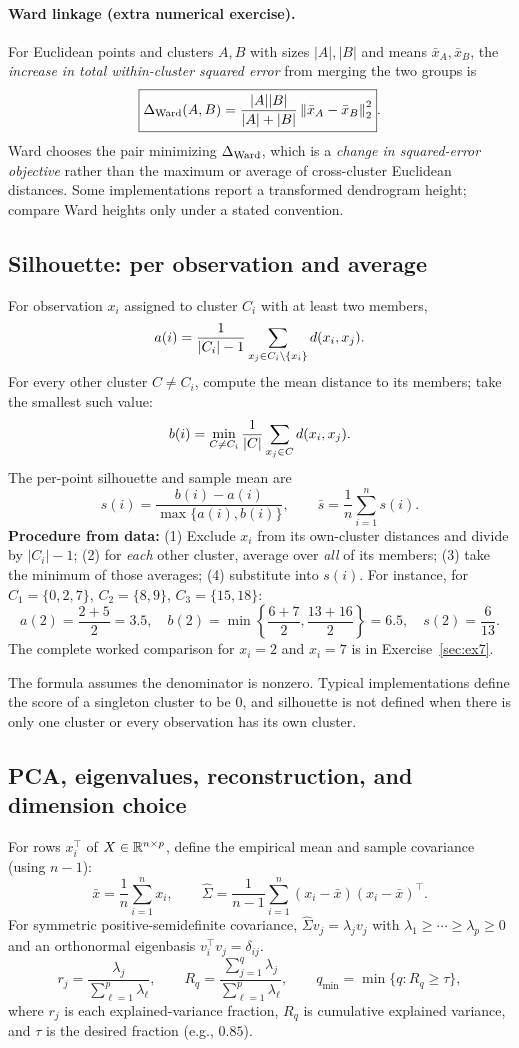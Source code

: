 \paragraph{Ward linkage (extra numerical exercise).}
For Euclidean points and clusters $A,B$ with sizes $|A|,|B|$ and means $\bar x_A,\bar x_B$, the \emph{increase in total within-cluster squared error} from merging the two groups is
\[
\boxed{\Delta_{\rm Ward}(A,B)=\frac{|A||B|}{|A|+|B|}\left\lVert\bar x_A-\bar x_B\right\rVert_2^2}.
\]
Ward chooses the pair minimizing $\Delta_{\rm Ward}$, which is a \emph{change in squared-error objective} rather than the maximum or average of cross-cluster Euclidean distances. Some implementations report a transformed dendrogram height; compare Ward heights only under a stated convention.

\subsection{Silhouette: per observation and average}
For observation $x_i$ assigned to cluster $C_i$ with at least two members,
\[
a(i)=\frac1{\left\lvert C_i\right\rvert-1}\sum_{x_j\in C_i\setminus\{x_i\}}d(x_i,x_j).
\]
For every other cluster $C\ne C_i$, compute the mean distance to its members; take the smallest such value:
\[
b(i)=\min_{C\ne C_i}\frac1{\left\lvert C\right\rvert}\sum_{x_j\in C}d(x_i,x_j).
\]
The per-point silhouette and sample mean are
\[
\boxed{s(i)=\frac{b(i)-a(i)}{\max\{a(i),b(i)\}}},\qquad
\boxed{\bar s=\frac1n\sum_{i=1}^{n}s(i)}.
\]
\textbf{Procedure from data:} (1) Exclude $x_i$ from its own-cluster distances and divide by $|C_i|-1$; (2) for \emph{each} other cluster, average over \emph{all} of its members; (3) take the minimum of those averages; (4) substitute into $s(i)$. For instance, for $C_1=\{0,2,7\}$, $C_2=\{8,9\}$, $C_3=\{15,18\}$:
\[
a(2)=\frac{2+5}{2}=3.5,\quad b(2)=\min\left\{\frac{6+7}{2},\frac{13+16}{2}\right\}=6.5,\quad s(2)=\frac6{13}.
\]
The complete worked comparison for $x_i=2$ and $x_i=7$ is in Exercise~\ref{sec:ex7}.

The formula assumes the denominator is nonzero. Typical implementations define the score of a singleton cluster to be $0$, and silhouette is not defined when there is only one cluster or every observation has its own cluster.

\subsection{PCA, eigenvalues, reconstruction, and dimension choice}
For rows $x_i^\top$ of $X\in\mathbb R^{n\times p}$, define the empirical mean and sample covariance (using $n-1$):
\[
\bar x=\frac1n\sum_{i=1}^{n}x_i,\qquad
\boxed{\hat\Sigma=\frac1{n-1}\sum_{i=1}^{n}(x_i-\bar x)(x_i-\bar x)^\top}.
\]
For symmetric positive-semidefinite covariance, $\hat\Sigma v_j=\lambda_j v_j$ with $\lambda_1\ge\cdots\ge\lambda_p\ge0$ and an orthonormal eigenbasis $v_i^\top v_j=\delta_{ij}$.
\[
\boxed{r_j=\frac{\lambda_j}{\sum_{\ell=1}^{p}\lambda_\ell}},\qquad
\boxed{R_q=\frac{\sum_{j=1}^{q}\lambda_j}{\sum_{\ell=1}^{p}\lambda_\ell}},\qquad
\boxed{q_{\min}=\min\{q:R_q\ge\tau\}},
\]
where $r_j$ is each explained-variance fraction, $R_q$ is cumulative explained variance, and $\tau$ is the desired fraction (e.g., $0.85$).

